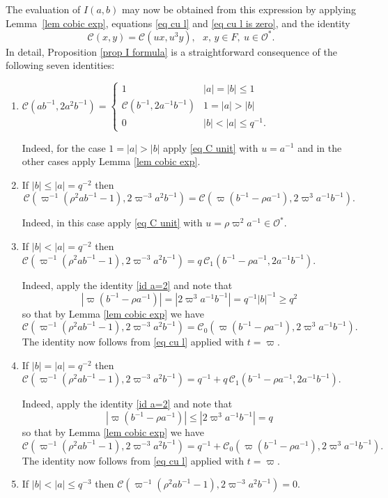 \documentclass[12pt]{amsart}
\newcommand{\abs}[1]{\left|{#1}\right|}
\renewcommand{\O}{\mathcal{O}}
\newcommand{\Cu}{\mathcal{C}}
\theoremstyle{remark}
\begin{document}
The evaluation of $I(a,b)$ may now 
 be obtained from this expression by applying Lemma~\ref{lem cobic exp}, equations \eqref{eq cu l} and \eqref{eq cu l is zero}, and the identity
\begin{equation}\label{eq C unit}
\Cu(x,y)=\Cu(ux,u^3y),\ \ \ x,\,y\in F,\ u\in\O^*.
\end{equation}
In detail, Proposition \ref{prop I formula} is a straightforward consequence of the following seven identities:
\begin{enumerate}
\item $\Cu(ab^{-1},2a^2b^{-1})=\begin{cases}
1 &\abs{a}=\abs{b}\le 1 \\ 
\Cu(b^{-1},2a^{-1}b^{-1}) & 1=\abs{a}>\abs{b} \\
0 & \abs{b}<\abs{a}\le q^{-1}.
\end{cases}$

Indeed, for the case $1=\abs{a}>\abs{b}$ apply \eqref{eq C unit} with $u=a^{-1}$ and in the other cases apply Lemma \ref{lem cobic exp}.
\item 
If $\abs{b}\le \abs{a}=q^{-2}$ then 
\begin{equation}\label{id a=2}
\Cu(\varpi^{-1}(\rho^2ab^{-1}-1),2\varpi^{-3}a^2b^{-1})=\Cu(\varpi(b^{-1}-\rho a^{-1}),2\varpi^3a^{-1}b^{-1}).
\end{equation}

Indeed, in this case apply \eqref{eq C unit} with $u=\rho\varpi^2 a^{-1}\in\O^*$.

\item If $\abs{b}< \abs{a}=q^{-2}$ then $\Cu(\varpi^{-1}(\rho^2ab^{-1}-1),2\varpi^{-3}a^2b^{-1})=q\,\Cu_1(b^{-1}-\rho a^{-1},2a^{-1}b^{-1})$.

Indeed, apply the identity \eqref{id a=2} and note that 
\[
\abs{\varpi(b^{-1}-\rho a^{-1})}=\abs{2\varpi^3a^{-1}b^{-1}}=q^{-1}\abs{b}^{-1}\ge q^2
\] 
so that by Lemma \ref{lem cobic exp} we have
\[
\Cu(\varpi^{-1}(\rho^2ab^{-1}-1),2\varpi^{-3}a^2b^{-1})=\Cu_0(\varpi(b^{-1}-\rho a^{-1}),2\varpi^3a^{-1}b^{-1}).
\]
The identity now follows from \eqref{eq cu l} applied with $t=\varpi$.
\item If $\abs{b}=\abs{a}=q^{-2}$ then $\Cu(\varpi^{-1}(\rho^2ab^{-1}-1),2\varpi^{-3}a^2b^{-1})=q^{-1}+q\,\Cu_1(b^{-1}-\rho a^{-1},2a^{-1}b^{-1})$.

Indeed, apply the identity \eqref{id a=2} and note that
\[
\abs{\varpi(b^{-1}-\rho a^{-1})}\le \abs{2\varpi^3a^{-1}b^{-1}}=q
\] 
so that by Lemma \ref{lem cobic exp} we have
\[
\Cu(\varpi^{-1}(\rho^2ab^{-1}-1),2\varpi^{-3}a^2b^{-1})=q^{-1}+\Cu_0(\varpi(b^{-1}-\rho a^{-1}),2\varpi^3a^{-1}b^{-1}).
\]
The identity now follows from \eqref{eq cu l} applied with $t=\varpi$.
\item If $\abs{b}<\abs{a}\le q^{-3}$ then $\Cu(\varpi^{-1}(\rho^2ab^{-1}-1),2\varpi^{-3}a^2b^{-1})=0$.


\end{enumerate}
\end{document}
